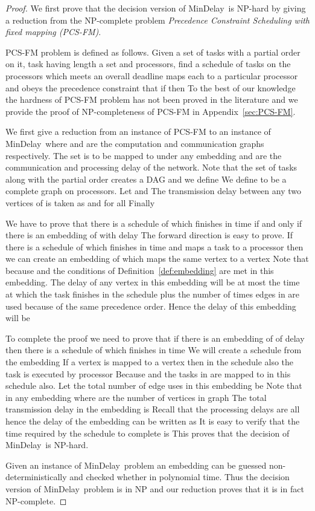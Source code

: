 \documentclass[journal]{IEEEtran}
\newcommand{\mindelay}{\textsf{MinDelay}}
\begin{document}
\begin{proof}
  We first prove that the decision version of \mindelay\ is NP-hard by
  giving a reduction from the NP-complete problem \textit{Precedence
    Constraint Scheduling with fixed mapping (PCS-FM)}\cite{Garey79}.

  PCS-FM problem is defined as follows. Given a set of tasks  with
  a partial order  on it, task  having length  a set  and  processors, find a schedule  of tasks on the
  processors which meets an overall deadline  maps each
   to a particular processor  and obeys
  the precedence constraint that if  then
   To the best of our knowledge the
  hardness of PCS-FM problem has not been proved in the literature and
  we provide the proof of NP-completeness of PCS-FM in Appendix~\ref{sec:PCS-FM}. 

  We first give a reduction from an instance  of PCS-FM to an instance
  of \mindelay\  where
   and  are the computation and communication graphs
  respectively. The set  is to be mapped to
   under any embedding  and
   are the communication and processing delay of the
  network. Note that the set of tasks  along with the partial order
  creates a DAG  and we define  We
  define  to be a complete graph on  processors. Let  and  The transmission delay  between
  any two vertices of  is taken as 
  and  for all  Finally 

  We have to prove that there is a schedule  of  which
  finishes in time  if and only if there is an embedding
   of  with delay  The forward direction is easy to prove. If there is a
  schedule of  which finishes in  time and maps a
  task  to a processor  then we can create an embedding of
   which maps the same vertex  to a vertex  Note that because  and  the conditions of Definition~\ref{def:embedding} are met in
  this embedding. The delay of any vertex  in this
  embedding will be at most the time at which the task  finishes in
  the schedule  plus the number of times edges in  are
  used because of the same precedence order. Hence the delay of this
  embedding will be 

  To complete the proof we need to prove that if there is an embedding
   of  of delay  then there
  is a schedule  of  which finishes in time  We will create a schedule  from the
  embedding  If a vertex  is mapped to
  a vertex  then in the schedule  also the
  task  is executed by processor  Because  and
   the tasks in  are mapped to  in
  this schedule also. Let the total number of edge uses in this
  embedding be  Note that  in any embedding where 
  are the number of vertices in graph  The total
  transmission delay in the embedding is  Recall that
  the processing delays are all  hence the delay of the embedding
  can be written as  It
  is easy to verify that the time required by the schedule  to
  complete is  This proves that the decision
  of \mindelay\ is NP-hard.

  Given an instance of \mindelay\ problem an embedding 
  can be guessed non-deterministically and checked whether
   in polynomial time. Thus the decision version
  of \mindelay\ problem is in NP and our reduction proves that it is
  in fact NP-complete.
\end{proof}
\end{document}
